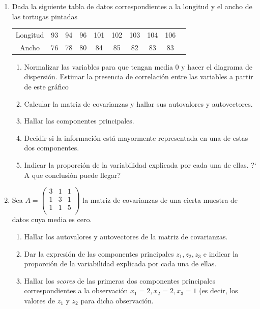 \documentclass[12pt]{article}
\begin{document}
\begin{enumerate}
\item Dada la siguiente tabla de datos correspondientes a la longitud y el ancho de las tortugas pintadas

\begin{table}[h]
\begin{center}
\begin{tabular}{|c|c|c|c|c|c|c|c|c|c|}
\hline
Longitud  & 93 & 94 & 96 & 101 & 102 & 103 & 104 & 106  \\
Ancho     & 76 & 78 & 80 & 84  & 85  & 82  & 83  & 83   \\
\hline
\end{tabular}
\end{center}
\end{table}
\begin{enumerate}
\item Normalizar las variables para que tengan media 0 y hacer el  diagrama de dispersi\'on. Estimar la presencia de correlaci\'on entre las variables a partir de este gr\'afico
\item Calcular la matriz de covarianzas y hallar sus autovalores y autovectores.
\item Hallar las componentes principales.
\item Decidir si la informaci\'on est\'a mayormente representada en una de estas dos componentes.
\item  Indicar la proporci\'on de la variabilidad explicada por cada una de ellas. ?` A que conclusi\'on  puede llegar?
\end{enumerate}



\item Sea
$
A = \left(
\begin{array}{ccc}
3 & 1 & 1 \\
1 & 3 & 1 \\
1 & 1 & 5\\
\end{array}
\right)
$
la matriz de covarianzas de una cierta muestra de datos cuya media es cero.
\begin{enumerate}
	\item Hallar los autovalores y autovectores de la matriz de covarianzas.
	\item  Dar la expresi\'on de las componentes principales $z_1, z_2, z_3$ e indicar la proporci\'on de la variabilidad explicada por cada una de ellas.
	\item Hallar los \textit{scores} de las primeras dos componentes principales correspondientes a la observaci\'on $x_1 = 2, x_2 = 2, x_3 = 1$ (es decir, los valores de $z_1$ y $z_2$ para dicha observaci\'on.
\end{enumerate}	



\end{enumerate}
\end{document}
